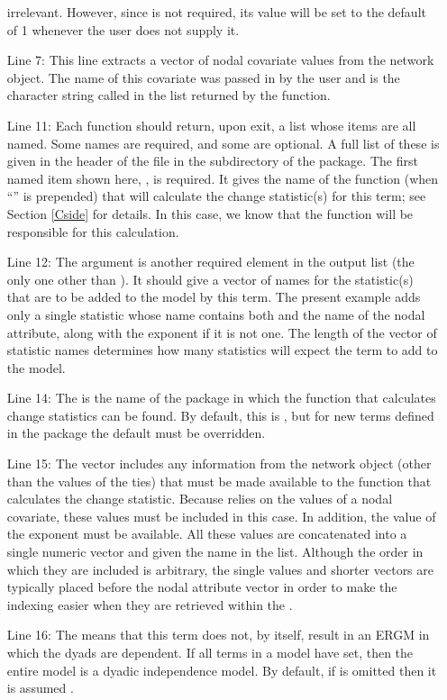 \documentclass[nojss]{jss}
\begin{document}
\begin{itemize}
irrelevant.  However, since  is not required, its value will be set to the
default of 1 whenever the user does not supply it.
\item[Line 7:] This line extracts a vector of nodal covariate
values from the network object.  The name of this covariate was passed in by the
user and is the character string called  in the list returned by the
 function.
\item[Line 11:]  Each  function should return, upon exit,
a list whose items are all named.  Some names are required, and some
are optional.  A full list of these is given in the header of the 
file in the  subdirectory of the  package.
The first named item shown here, , is required.  It gives the name
of the  function (when ``'' is prepended) that will calculate the
change statistic(s) for this term; see Section \ref{Cside} for details.  In this case,
we know that the function  will be responsible for this calculation.
\item [Line 12:]  The  argument 
is another required element in the output
list (the only one other than ).  It should give a vector of names
for the statistic(s) that are to be added to the model by this term.  The present
example adds only a single statistic whose name contains
both  and the name of the nodal attribute, along with the exponent
 if it is not one.  The length of the vector of statistic names determines how
many statistics  will expect the term to add to the model.
\item [Line 14:]
The  is the name of the  package in which the
 function that calculates change statistics can be found.  By default,
this is , but for new terms defined in the  package
the default must be overridden.
\item [Line 15:]
The  vector includes any information from the network object (other than the values of the ties) that must be made available to the  function that calculates the change statistic.  Because  relies on the values of a nodal covariate, these values must be included in this case. In addition, the value of the
 exponent must be available.  All these values
are concatenated into a single numeric vector and given the name  in the
list. Although the order in which they are included is arbitrary, the single values and shorter vectors are typically placed before the nodal attribute vector in order to make the indexing easier when they are retrieved within the .
\item[Line 16:]  The  means that this term does not, by itself,
result in an ERGM in which the dyads are dependent.   If all terms in a model
have  set, then the entire model is a dyadic independence
model.  By default, if  is omitted then it is assumed .
\end{itemize}
\end{document}
